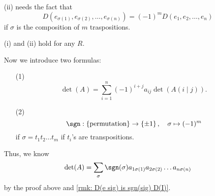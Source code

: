 \begin{remark} \label{rmk: D(e sig) is sgn(sig) D(I)}
    (ii) needs the fact that 
    \[
        D \left( e_{\sigma (1)}, e_{\sigma (2)}, \dots , e_{\sigma (n)} \right) = (-1)^m D(e_1, e_2, \dots , e_n) 
    \] if \(\sigma \) is the composition of \(m\) traspositions.  
\end{remark}

\begin{remark}
    (i) and (ii) hold for any \(R\). 
\end{remark}

Now we introduce two formulas: 
\begin{itemize}
    \item [(1)] 
    \[
        \det (A) = \sum_{i=1}^n (-1)^{i+j} a_{ij} \det \left( A(i \mid j) \right).  
    \]
    \item [(2)] 
    \[
        \sgn : \left\{ \text{permutation}  \right\} \to \left\{ \pm 1 \right\}, \quad \sigma \mapsto (-1)^m   
    \] if \(\sigma = t_1 t_2 \dots t_m\) if \(t_i\)'s are transpositions.  
\end{itemize}

Thus, we know 
\[
    \det (A) = \sum_{\sigma } \sgn (\sigma ) a_{1 \sigma (1)} a_{2 \sigma (2)} \dots a_{n \sigma (n)} 
\] by the proof above and \autoref{rmk: D(e sig) is sgn(sig) D(I)}. 
